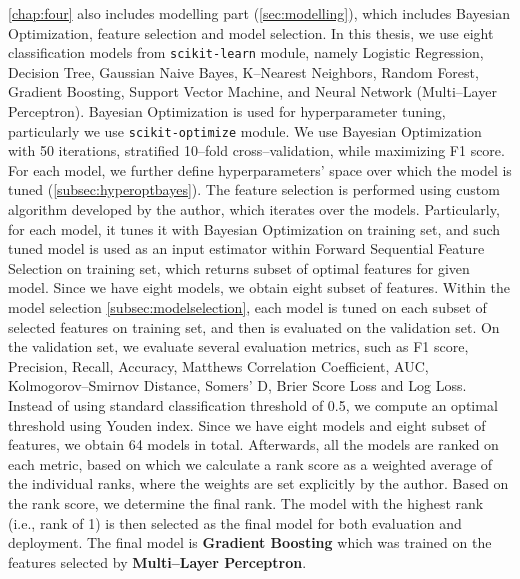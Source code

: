 \autoref{chap:four} also includes modelling part (\autoref{sec:modelling}), which includes Bayesian Optimization, feature selection and model selection.
In this thesis, we use eight classification models from \lstinline{scikit-learn} module, namely Logistic Regression, Decision Tree, Gaussian Naive Bayes, K--Nearest Neighbors, Random Forest, Gradient Boosting, Support Vector Machine, and Neural Network (Multi--Layer Perceptron).
Bayesian Optimization is used for hyperparameter tuning, particularly we use \lstinline{scikit-optimize} module. We use Bayesian Optimization with 50 iterations, stratified 10--fold cross--validation, while maximizing F1 score. For each model, we further define hyperparameters' space over which the model is tuned (\autoref{subsec:hyperoptbayes}).
The feature selection is performed using custom algorithm developed by the author, which iterates over the models. Particularly, for each model, it tunes it with Bayesian Optimization on training set, and such tuned model is used as an input estimator within Forward Sequential Feature Selection on training set, which returns subset of optimal features for given model. Since we have eight models, we obtain eight subset of features.
Within the model selection \autoref{subsec:modelselection}, each model is tuned on each subset of selected features on training set, and then is evaluated on the validation set. On the validation set, we evaluate several evaluation metrics, such as F1 score, Precision, Recall, Accuracy, Matthews Correlation Coefficient, AUC, Kolmogorov--Smirnov Distance, Somers' D, Brier Score Loss and Log Loss.
Instead of using standard classification threshold of 0.5, we compute an optimal threshold using Youden index. Since we have eight models and eight subset of features, we obtain 64 models in total.
Afterwards, all the models are ranked on each metric, based on which we calculate a rank score as a weighted average of the individual ranks, where the weights are set explicitly by the author. Based on the rank score, we determine the final rank. The model with the highest rank (i.e., rank of 1) is then selected as the final model for both evaluation and deployment.
The final model is \textbf{Gradient Boosting} which was trained on the features selected by \textbf{Multi--Layer Perceptron}.


